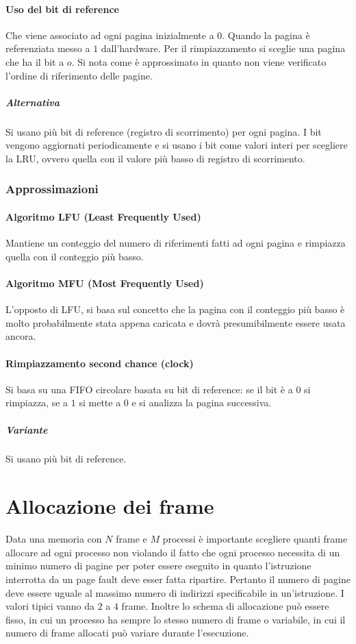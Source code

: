 \paragraph{Uso del bit di reference}
Che viene associato ad ogni pagina inizialmente a $0$. Quando la pagina \`e referenziata messo a $1$ dall'hardware. Per il rimpiazzamento si sceglie una pagina che ha il bit a $o$. Si
nota come \`e approssimato in quanto non viene verificato l'ordine di riferimento delle pagine. 
\subparagraph{Alternativa}
Si usano pi\`u bit di reference (registro di scorrimento) per ogni pagina. I bit vengono aggiornati periodicamente e si usano i bit come valori interi per scegliere la LRU, ovvero 
quella con il valore pi\`u basso di registro di scorrimento. 
\subsubsection{Approssimazioni}
\paragraph{Algoritmo LFU (Least Frequently Used)}
Mantiene un conteggio del numero di riferimenti fatti ad ogni pagina e rimpiazza quella con il conteggio pi\`u basso. 
\paragraph{Algoritmo MFU (Most Frequently Used)}
L'opposto di LFU, si basa sul concetto che la pagina con il conteggio pi\`u basso \`e molto probabilmente stata appena caricata e dovr\`a presumibilmente essere usata ancora. 
\paragraph{Rimpiazzamento second chance (clock)}
Si basa su una FIFO circolare basata su bit di reference: se il bit \`e a $0$ si rimpiazza, se a $1$ si mette a $0$ e si analizza la pagina successiva. 
\subparagraph{Variante}
Si usano pi\`u bit di reference. 
\section{Allocazione dei frame}
Data una memoria con $N$ frame e $M$ processi \`e importante scegliere quanti frame allocare ad ogni processo non violando il fatto che ogni processo necessita di un minimo numero di 
pagine per poter essere eseguito in quanto l'istruzione interrotta da un page fault deve esser fatta ripartire. Pertanto il numero di pagine deve essere uguale al massimo numero di 
indirizzi specificabile in un'istruzione. I valori tipici vanno da $2$ a $4$ frame. Inoltre lo schema di allocazione pu\`o essere fisso, in cui un processo ha sempre lo stesso numero
di frame o variabile, in cui il numero di frame allocati pu\`o variare durante l'esecuzione. 
